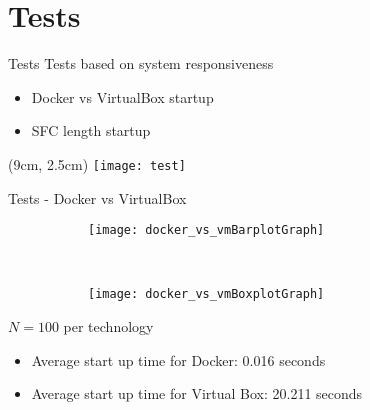 \section{Tests}
\begin{frame}{Tests}
  Tests based on system responsiveness
  \begin{itemize}
    \item<1-> Docker vs VirtualBox startup
    \item<2-> SFC length startup 
  \end{itemize}

  \begin{textblock*}{5cm}(9cm, 2.5cm)
    \texttt{[image: test]}
  \end{textblock*}
\end{frame}

\begin{frame}{Tests - Docker vs VirtualBox}

  \begin{figure}
    \centering
    \begin{subfigure}[b]{0.42\textwidth}
      \texttt{[image: docker\_vs\_vmBarplotGraph]}
    \end{subfigure}
    ~
    \begin{subfigure}[b]{0.42\textwidth}
      \texttt{[image: docker\_vs\_vmBoxplotGraph]}
    \end{subfigure}
  \end{figure}

  \noindent $N = 100$ per technology

  \begin{itemize}
  \item Average start up time for Docker: 0.016 seconds
  \item Average start up time for Virtual Box: 20.211 seconds
  \end{itemize}

\end{frame}

